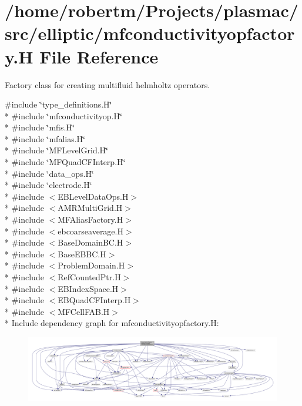 \hypertarget{mfconductivityopfactory_8H}{}\section{/home/robertm/\+Projects/plasmac/src/elliptic/mfconductivityopfactory.H File Reference}
\label{mfconductivityopfactory_8H}


Factory class for creating multifluid helmholtz operators.  


{\ttfamily \#include \char`\"{}type\+\_\+definitions.\+H\char`\"{}}\\*
{\ttfamily \#include \char`\"{}mfconductivityop.\+H\char`\"{}}\\*
{\ttfamily \#include \char`\"{}mfis.\+H\char`\"{}}\\*
{\ttfamily \#include \char`\"{}mfalias.\+H\char`\"{}}\\*
{\ttfamily \#include \char`\"{}M\+F\+Level\+Grid.\+H\char`\"{}}\\*
{\ttfamily \#include \char`\"{}M\+F\+Quad\+C\+F\+Interp.\+H\char`\"{}}\\*
{\ttfamily \#include \char`\"{}data\+\_\+ops.\+H\char`\"{}}\\*
{\ttfamily \#include \char`\"{}electrode.\+H\char`\"{}}\\*
{\ttfamily \#include $<$E\+B\+Level\+Data\+Ops.\+H$>$}\\*
{\ttfamily \#include $<$A\+M\+R\+Multi\+Grid.\+H$>$}\\*
{\ttfamily \#include $<$M\+F\+Alias\+Factory.\+H$>$}\\*
{\ttfamily \#include $<$ebcoarseaverage.\+H$>$}\\*
{\ttfamily \#include $<$Base\+Domain\+B\+C.\+H$>$}\\*
{\ttfamily \#include $<$Base\+E\+B\+B\+C.\+H$>$}\\*
{\ttfamily \#include $<$Problem\+Domain.\+H$>$}\\*
{\ttfamily \#include $<$Ref\+Counted\+Ptr.\+H$>$}\\*
{\ttfamily \#include $<$E\+B\+Index\+Space.\+H$>$}\\*
{\ttfamily \#include $<$E\+B\+Quad\+C\+F\+Interp.\+H$>$}\\*
{\ttfamily \#include $<$M\+F\+Cell\+F\+A\+B.\+H$>$}\\*
Include dependency graph for mfconductivityopfactory.\+H\+:\nopagebreak
\begin{figure}[H]
\begin{center}
\leavevmode
\includegraphics[width=350pt]{mfconductivityopfactory_8H__incl}
\end{center}
\end{figure}
